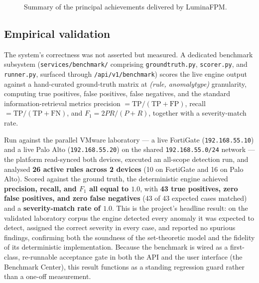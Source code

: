 \documentclass[12pt,a4paper]{report}
\renewcommand{\_}{\textunderscore\allowbreak}
\begin{document}
\begin{figure}[htbp]
\centering
{}
\caption{Summary of the principal achievements delivered by LuminaFPM.}
\label{fig:ch5-achievement-summary}
\end{figure}

\subsection{Empirical validation}
\label{sec:ch5-validation}

The system's correctness was not asserted but measured. A dedicated benchmark subsystem (\texttt{services/benchmark/} comprising \texttt{ground\_truth.py}, \texttt{scorer.py}, and \texttt{runner.py}, surfaced through \texttt{/api/v1/benchmark}) scores the live engine output against a hand-curated ground-truth matrix at \emph{(rule, anomaly\_type)} granularity, computing true positives, false positives, false negatives, and the standard information-retrieval metrics precision $=\text{TP}/(\text{TP}+\text{FP})$, recall $=\text{TP}/(\text{TP}+\text{FN})$, and $F_1 = 2PR/(P+R)$, together with a severity-match rate.

Run against the parallel VMware laboratory --- a live FortiGate (\texttt{192.168.55.10}) and a live Palo Alto (\texttt{192.168.55.20}) on the shared \texttt{192.168.55.0/24} network --- the platform read-synced both devices, executed an all-scope detection run, and analysed \textbf{26 active rules across 2 devices} (10 on FortiGate and 16 on Palo Alto). Scored against the ground truth, the deterministic engine achieved \textbf{precision, recall, and $F_1$ all equal to $1.0$}, with \textbf{43 true positives, zero false positives, and zero false negatives} (43 of 43 expected cases matched) and a \textbf{severity-match rate of $1.0$}. This is the project's headline result: on the validated laboratory corpus the engine detected every anomaly it was expected to detect, assigned the correct severity in every case, and reported no spurious findings, confirming both the soundness of the set-theoretic model and the fidelity of its deterministic implementation. Because the benchmark is wired as a first-class, re-runnable acceptance gate in both the API and the user interface (the Benchmark Center), this result functions as a standing regression guard rather than a one-off measurement.
\end{document}

